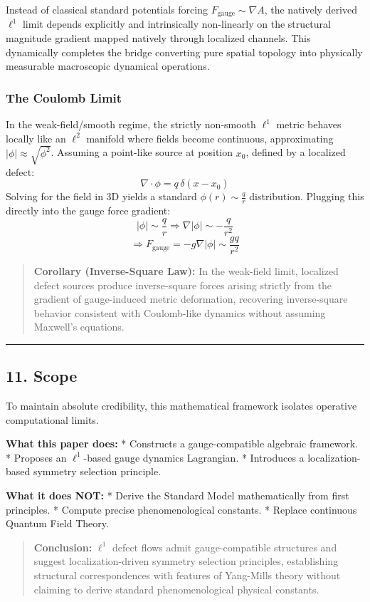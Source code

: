 \documentclass[
]{article}
\begin{document}
Instead of classical standard potentials forcing
\(F_{\text{gauge}} \sim \nabla A\), the natively derived \(\ell^1\)
limit depends explicitly and intrinsically non-linearly on the
structural magnitude gradient mapped natively through localized
channels. This dynamically completes the bridge converting pure spatial
topology into physically measurable macroscopic dynamical operations.

\subsubsection{The Coulomb Limit}\label{the-coulomb-limit}

In the weak-field/smooth regime, the strictly non-smooth \(\ell^1\)
metric behaves locally like an \(\ell^2\) manifold where fields become
continuous, approximating \(|\phi| \approx \sqrt{\phi^2}\). Assuming a
point-like source at position \(x_0\), defined by a localized defect:
\[ \nabla \cdot \phi = q \, \delta(x - x_0) \] Solving for the field in
3D yields a standard \(\phi(r) \sim \frac{q}{r}\) distribution. Plugging
this directly into the gauge force gradient:
\[ |\phi| \sim \frac{q}{r} \Rightarrow \nabla |\phi| \sim -\frac{q}{r^2} \]
\[ \Rightarrow F_{\text{gauge}} = -g \nabla |\phi| \sim \frac{g q}{r^2} \]

\begin{quote}
\textbf{Corollary (Inverse-Square Law):} In the weak-field limit,
localized defect sources produce inverse-square forces arising strictly
from the gradient of gauge-induced metric deformation, recovering
inverse-square behavior consistent with Coulomb-like dynamics without
assuming Maxwell's equations.
\end{quote}

\begin{center}\rule{0.5\linewidth}{0.5pt}\end{center}

\subsection{11. Scope}\label{scope}

To maintain absolute credibility, this mathematical framework isolates
operative computational limits.

\textbf{What this paper does:} * Constructs a gauge-compatible algebraic
framework. * Proposes an \(\ell^1\)-based gauge dynamics Lagrangian. *
Introduces a localization-based symmetry selection principle.

\textbf{What it does NOT:} * Derive the Standard Model mathematically
from first principles. * Compute precise phenomenological constants. *
Replace continuous Quantum Field Theory.

\begin{quote}
\textbf{Conclusion:} \(\ell^1\) defect flows admit gauge-compatible
structures and suggest localization-driven symmetry selection
principles, establishing structural correspondences with features of
Yang-Mills theory without claiming to derive standard phenomenological
physical constants.
\end{quote}
\end{document}
